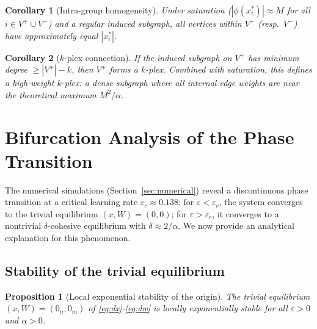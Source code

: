 \documentclass[3p]{elsarticle}
\newtheorem{corollary}{Corollary}
\newtheorem{proposition}{Proposition}
\begin{document}
\begin{corollary}[Intra-group homogeneity] \label{cor:homog}
  Under saturation ($|\phi(x_i^*)|\approx M$ for all $i\in V^+\cup V^-$) and a regular induced subgraph, all vertices within $V^+$ (resp.\ $V^-$) have approximately equal $|x_i^*|$.
\end{corollary}

\begin{corollary}[$k$-plex connection] \label{cor:kplex}
  If the induced subgraph on $V^+$ has minimum degree $\ge |V^+|-k$, then $V^+$ forms a $k$-plex. Combined with saturation, this defines a \emph{high-weight $k$-plex}: a dense subgraph where all internal edge weights are near the theoretical maximum $M^2/\alpha$.
\end{corollary}

\section{Bifurcation Analysis of the Phase Transition} \label{sec:bifurcation}

The numerical simulations (Section~\ref{sec:numerical}) reveal a discontinuous phase transition at a critical learning rate $\varepsilon_c \approx 0.138$: for $\varepsilon < \varepsilon_c$, the system converges to the trivial equilibrium $(x,W)=(0,0)$; for $\varepsilon > \varepsilon_c$, it converges to a nontrivial $\delta$-cohesive equilibrium with $\delta \approx 2/\alpha$. We now provide an analytical explanation for this phenomenon.

\subsection{Stability of the trivial equilibrium}

\begin{proposition}[Local exponential stability of the origin] \label{prop:trivial}
The trivial equilibrium $(x,W)=(0_{n},0_{m})$ of \eqref{eq:dx}-\eqref{eq:dw} is locally exponentially stable for all $\varepsilon>0$ and $\alpha>0$.
\end{proposition}
\end{document}
